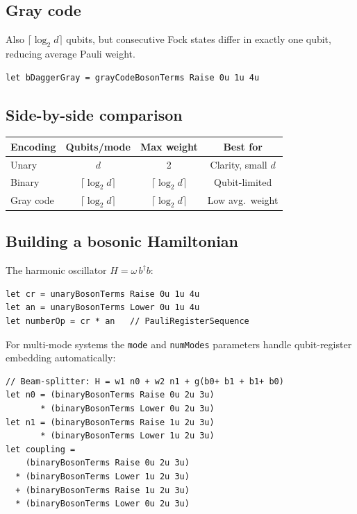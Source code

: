 \documentclass[10pt,a4paper]{article}
\begin{document}
\subsection{Gray code}

Also $\lceil\log_2 d\rceil$ qubits, but consecutive Fock states differ
in exactly one qubit, reducing average Pauli weight.

\begin{lstlisting}
let bDaggerGray = grayCodeBosonTerms Raise 0u 1u 4u
\end{lstlisting}

\subsection{Side-by-side comparison}

\begin{center}
\small
\begin{tabular}{lccc}
\toprule
\textbf{Encoding} & \textbf{Qubits/mode} & \textbf{Max weight} & \textbf{Best for} \\
\midrule
Unary & $d$ & 2 & Clarity, small $d$ \\
Binary & $\lceil\log_2 d\rceil$ & $\lceil\log_2 d\rceil$ & Qubit-limited \\
Gray code & $\lceil\log_2 d\rceil$ & $\lceil\log_2 d\rceil$ & Low avg.\ weight \\
\bottomrule
\end{tabular}
\end{center}

\subsection{Building a bosonic Hamiltonian}

The harmonic oscillator $H = \omega\, b^\dagger b$:

\begin{lstlisting}
let cr = unaryBosonTerms Raise 0u 1u 4u
let an = unaryBosonTerms Lower 0u 1u 4u
let numberOp = cr * an   // PauliRegisterSequence
\end{lstlisting}

For multi-mode systems the \texttt{mode} and \texttt{numModes}
parameters handle qubit-register embedding automatically:

\begin{lstlisting}
// Beam-splitter: H = w1 n0 + w2 n1 + g(b0+ b1 + b1+ b0)
let n0 = (binaryBosonTerms Raise 0u 2u 3u)
       * (binaryBosonTerms Lower 0u 2u 3u)
let n1 = (binaryBosonTerms Raise 1u 2u 3u)
       * (binaryBosonTerms Lower 1u 2u 3u)
let coupling =
    (binaryBosonTerms Raise 0u 2u 3u)
  * (binaryBosonTerms Lower 1u 2u 3u)
  + (binaryBosonTerms Raise 1u 2u 3u)
  * (binaryBosonTerms Lower 0u 2u 3u)
\end{lstlisting}
\end{document}
